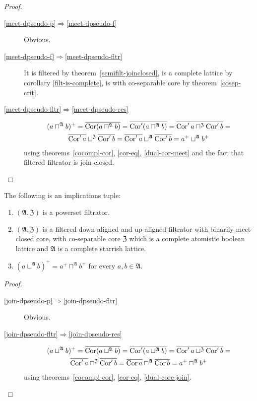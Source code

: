 \begin{proof}
~
\begin{description}
\item [\ref{meet-dpseudo-p}$\Rightarrow$\ref{meet-dpseudo-f}] Obvious.
\item [\ref{meet-dpseudo-f}$\Rightarrow$\ref{meet-dpseudo-fltr}]
It is filtered by theorem~\ref{semifilt-joinclosed},
is a complete lattice by corollary \ref{filt-is-complete},
is with co-separable core by theorem~\ref{cosep-crit}.
\item [\ref{meet-dpseudo-fltr}$\Rightarrow$\ref{meet-dpseudo-res}]
\begin{multline*}
(a\sqcap^{\mathfrak{A}}b)^{+}=
\overline{\operatorname{Cor}(a\sqcap^{\mathfrak{A}}b)} =
\overline{\operatorname{Cor}'(a\sqcap^{\mathfrak{A}}b)} =
\overline{\operatorname{Cor}' a\sqcap^{\mathfrak{Z}}\operatorname{Cor}' b} =\\
\overline{\operatorname{Cor}'a}\sqcup^{\mathfrak{Z}}\overline{\operatorname{Cor}'b}=
\overline{\operatorname{Cor}'a}\sqcup^{\mathfrak{A}}\overline{\operatorname{Cor}'b}=
a^{+}\sqcup^{\mathfrak{A}}b^{+}
\end{multline*}
using theorems~\ref{cocompl-cor}, \ref{cor-eq}, \ref{dual-cor-meet} and the fact that filtered filtrator is join-closed.
\end{description}
\end{proof}

\begin{thm}
The following is an implications tuple:
\begin{enumerate}
\item \label{join-dpseudo-p}$(\mathfrak{A},\mathfrak{Z})$ is a powerset filtrator.
\item \label{join-dpseudo-fltr} $(\mathfrak{A},\mathfrak{Z})$ is a filtered
down-aligned and up-aligned filtrator with binarily meet-closed core, with co-separable core $\mathfrak{Z}$
which is a complete atomistic boolean lattice and $\mathfrak{A}$ is a complete
starrish lattice.
\item \label{join-dpseudo-res}$(a\sqcup^{\mathfrak{A}}b)^{+}=a^{+}\sqcap^{\mathfrak{A}}b^{+}$
for every $a,b\in\mathfrak{A}$.
\end{enumerate}
\end{thm}

\begin{proof}
~
\begin{description}
\item [\ref{join-dpseudo-p}$\Rightarrow$\ref{join-dpseudo-fltr}] Obvious.
\item [\ref{join-dpseudo-fltr}$\Rightarrow$\ref{join-dpseudo-res}]
\begin{multline*}
(a\sqcup^{\mathfrak{A}}b)^{+}=
\overline{\operatorname{Cor}(a\sqcup^{\mathfrak{A}}b)} =
\overline{\operatorname{Cor}'(a\sqcup^{\mathfrak{A}}b)} =
\overline{\operatorname{Cor}'a\sqcup^{\mathfrak{Z}}\operatorname{Cor}'b} =\\
\overline{\operatorname{Cor}'a}\sqcap^{\mathfrak{Z}}\overline{\operatorname{Cor}'b} =
\overline{\operatorname{Cor} a}\sqcap^{\mathfrak{A}}\overline{\operatorname{Cor} b} =
a^{+}\sqcap^{\mathfrak{A}}b^{+}
\end{multline*}
using theorems~\ref{cocompl-cor}, \ref{cor-eq}, \ref{dual-core-join}.
\end{description}
\end{proof}

